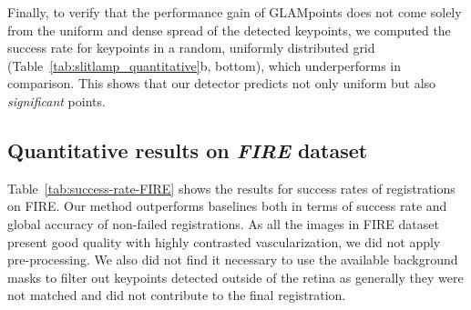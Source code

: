 Finally, to verify that the performance gain of GLAMpoints does not come solely from the uniform and dense spread of the detected keypoints, we computed the success rate for keypoints in a random, uniformly distributed grid (Table~\ref{tab:slitlamp_quantitative}b, bottom), which underperforms in comparison. This shows that our detector predicts not only uniform but also \textit{significant} points.



\begin{table}[t]
\centering
\caption{Success rates (\%) of each detector on \textit{FIRE}.}
\label{tab:success-rate-FIRE}
\vspace{-2mm}
\vspace{-4mm}
\label{tab:FIRE_threshold}
\end{table}

\subsection{Quantitative results on \textbf{\textit{FIRE}} dataset}

Table~\ref{tab:success-rate-FIRE} shows the results for success rates of registrations on FIRE. Our method outperforms baselines both in terms of success rate and global accuracy of non-failed registrations. As all the images in FIRE dataset present good quality with highly contrasted vascularization, we did not apply pre-processing. We also did not find it necessary to use the available background masks to filter out keypoints detected outside of the retina as generally they were not matched and did not contribute to the final registration. 

